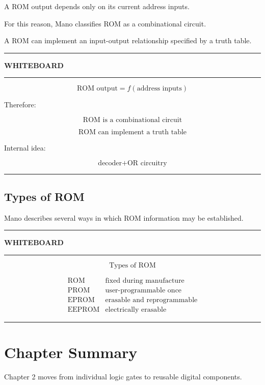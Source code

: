 \documentclass[11pt]{article}
\newenvironment{whiteboard}
{
    \par\medskip
    \hrule
    \vspace{0.35em}
    \noindent\textbf{\large WHITEBOARD}
    \par\vspace{0.3em}
    \hrule
    \vspace{0.65em}
}
{
    \vspace{0.45em}
    \hrule
    \par\medskip
}
\begin{document}
A ROM output depends only on its current address inputs.

For this reason, Mano classifies ROM as a combinational circuit.

A ROM can implement an input-output relationship specified by a truth table.

\begin{whiteboard}

\[
\boxed{
\text{ROM output}
=
f(\text{address inputs})
}
\]

Therefore:

\[
\boxed{
\text{ROM is a combinational circuit}
}
\]

\[
\boxed{
\text{ROM can implement a truth table}
}
\]

Internal idea:

\[
\boxed{
\text{decoder}
+
\text{OR circuitry}
}
\]

\end{whiteboard}

\subsection{Types of ROM}

Mano describes several ways in which ROM information may be established.

\begin{whiteboard}

\[
\boxed{\text{Types of ROM}}
\]

\[
\begin{array}{c|l}
\text{ROM}
&
\text{fixed during manufacture}
\\
\text{PROM}
&
\text{user-programmable once}
\\
\text{EPROM}
&
\text{erasable and reprogrammable}
\\
\text{EEPROM}
&
\text{electrically erasable}
\end{array}
\]

\end{whiteboard}

\section{Chapter Summary}

Chapter 2 moves from individual logic gates to reusable digital components.
\end{document}
